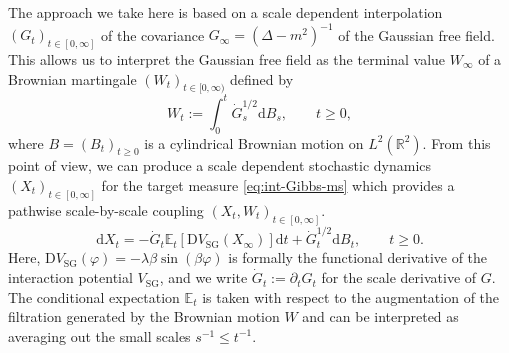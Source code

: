 \documentclass[11pt, a4paper]{scrartcl}
\numberwithin{equation}{section}
\theoremstyle{plain}
\theoremstyle{remark}
\newcommand{\assign}{:=}
\newcommand{\mathD}{\mathrm{D}}
\newcommand{\mathd}{\mathrm{d}}
\newcommand{\tmop}[1]{\ensuremath{\operatorname{#1}}}
\begin{document}
The approach we take here is based on a scale dependent interpolation
$(G_t)_{t \in [0, \infty]}$ of the covariance $G_{\infty} = (\Delta - m^2)^{-
1}$ of the Gaussian free field. This allows us to interpret the Gaussian free
field as the terminal value $W_{\infty}$ of a Brownian martingale $(W_t)_{t
\in [0, \infty)}$ defined by
\begin{equation}
  W_t \assign \int_0^t \dot{G}_s^{1 / 2} \mathd B_s, \qquad t \geqslant 0,
  \label{eq:GFF}
\end{equation}
where $B = (B_t)_{t \geqslant 0}$ is a cylindrical Brownian motion on $L^2
(\mathbb{R}^2)$. From this point of view, we can produce a scale dependent
stochastic dynamics $(X_t)_{t \in [0, \infty]}$ for the target measure
\eqref{eq:int-Gibbs-ms} which provides a pathwise
scale-by-scale coupling $(X_t, W_t)_{t \in [0, \infty]}$.
\begin{equation}
  \mathd X_t = - \dot{G}_t \mathbb{E}_t [\mathD V_{\tmop{SG}} (X_{\infty})]
  \mathd t + \dot{G}_t^{1 / 2} \mathd B_t, \qquad t \geqslant 0.
  \label{eq:fbsde-intro}
\end{equation}
Here, $\mathD V_{\tmop{SG}} (\varphi) = - \lambda \beta \sin (\beta \varphi)$ is
formally the functional derivative of the interaction potential
$V_{\tmop{SG}}$, and we write $\dot{G}_t \assign \partial_t G_t$ for the scale
derivative of $G$. The conditional expectation $\mathbb E_t$ is taken with respect to the
augmentation of the filtration generated by the Brownian motion $W$ and can 
be interpreted as averaging out the small scales $s^{-1}\leqslant t^{-1}$.
\end{document}
